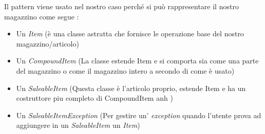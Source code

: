 \documentclass[12pt]{article}
\begin{document}
Il pattern viene usato nel nostro caso perché si può rappresentare il nostro magazzino come segue \cite{gof_sunt}:
\begin{itemize}
    \item Un \textit{Item} (è una classe astratta che fornisce le operazione base del nostro magazzino/articolo)
    \item Un \textit{CompoundItem} (La classe estende Item e si comporta sia come una parte del magazzino o come il magazzino intero a secondo di come è usato)
    \item Un \textit{SaleableItem} (Questa classe è l'articolo proprio, estende Item e ha un costruttore piu completo di CompoundItem anh )
    \item Un  \textit{SaleableItemException} (Per gestire un' \textit{exception} quando l'utente prova ad aggiungere in un \textit{SaleableItem} un \textit{Item})
\end{itemize}
\\
\end{document}

